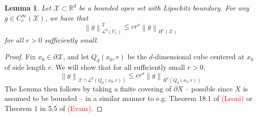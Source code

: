 \documentclass{article}
\newcommand{\Reals}{\mathbb{R}}
\newcommand{\norm}[1]{\left \lVert #1 \right \rVert}
\newcommand{\1}{\mathbf{1}}
\newcommand{\Rd}{\Reals^d}
\newcommand{\Xset}{\mathcal{X}}
\newcommand{\Leb}{\mathcal{L}}
\theoremstyle{alden}
\theoremstyle{aldenthm}
\newtheorem{lemma}{Lemma}
\theoremstyle{definition}
\theoremstyle{remark}
\begin{document}
\begin{lemma}
	\label{lem:boundary_term_sobolev}
	Let $\Xset \subset \Rd$ be a bounded open set with Lipschitz boundary. For any $g \in C_c^{\infty}(\Xset)$, we have that 
	\begin{equation*}
	\norm{g}_{\Leb^2(U_r)}^2 \leq c r^s \norm{g}_{H^s(\Xset)}
	\end{equation*}
	for all $r > 0$ sufficiently small.
\end{lemma}
\begin{proof}
	Fix $x_0 \in \partial \Xset$, and let $Q_d(x_0,r)$ be the $d$-dimensional cube centered at $x_0$ of side length $r$. We will show that for all sufficiently small $r > 0$,
	\begin{equation}
	\norm{g}_{\Xset \cap \Leb^2(Q_d(x_0,r))} \leq c r^s \norm{g}_{H^s(Q_d(x_0,r))}
	\end{equation}
	The Lemma then follows by taking a finite covering of $\partial X$ -- possible since $X$ is assumed to be bounded -- in a similar manner to e.g. Theorem 18.1 of \textcolor{red}{(Leoni)} or Theorem 1 in 5.5 of \textcolor{red}{(Evans)}.
	

\end{proof}
\end{document}
